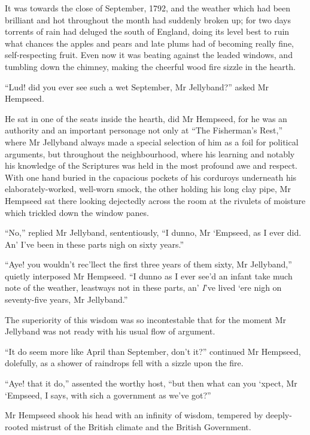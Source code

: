 It was towards the close of September, 1792, and the weather which had been brilliant and hot throughout the month had suddenly broken up; for two days torrents of rain had deluged the south of England, doing its level best to ruin what chances the apples and pears and late plums had of becoming really fine, self-respecting fruit. Even now it was beating against the leaded windows, and tumbling down the chimney, making the cheerful wood fire sizzle in the hearth.

\enquote{Lud! did you ever see such a wet September, Mr Jellyband?} asked Mr Hempseed.

He sat in one of the seats inside the hearth, did Mr Hempseed, for he was an authority and an important personage not only at \enquote{The Fisherman's Rest,} where Mr Jellyband always made a special selection of him as a foil for political arguments, but throughout the neighbourhood, where his learning and notably his knowledge of the Scriptures was held in the most profound awe and respect. With one hand buried in the capacious pockets of his corduroys underneath his elaborately-worked, well-worn smock, the other holding his long clay pipe, Mr Hempseed sat there looking dejectedly across the room at the rivulets of moisture which trickled down the window panes.

\enquote{No,} replied Mr Jellyband, sententiously, \enquote{I dunno, Mr `Empseed, as I ever did. An’ I've been in these parts nigh on sixty years.}

\enquote{Aye! you wouldn't rec'llect the first three years of them sixty, Mr Jellyband,} quietly interposed Mr Hempseed. \enquote{I dunno as I ever see'd an infant take much note of the weather, leastways not in these parts, an’ \textit{I}'ve lived `ere nigh on seventy-five years, Mr Jellyband.}

The superiority of this wisdom was so incontestable that for the moment Mr Jellyband was not ready with his usual flow of argument.

\enquote{It do seem more like April than September, don't it?} continued Mr Hempseed, dolefully, as a shower of raindrops fell with a sizzle upon the fire.

\enquote{Aye! that it do,} assented the worthy host, \enquote{but then what can you `xpect, Mr `Empseed, I says, with sich a government as we've got?}

Mr Hempseed shook his head with an infinity of wisdom, tempered by deeply-rooted mistrust of the British climate and the British Government.


